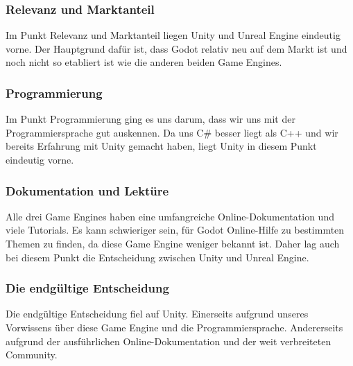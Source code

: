 \subsubsection{Relevanz und Marktanteil}
Im Punkt Relevanz und Marktanteil liegen Unity und Unreal Engine eindeutig vorne. Der Hauptgrund dafür ist, dass Godot relativ neu auf dem Markt ist und noch nicht so etabliert ist wie die anderen beiden Game Engines.

\subsubsection{Programmierung}
Im Punkt Programmierung ging es uns darum, dass wir uns mit der Programmiersprache gut auskennen. Da uns C\# besser liegt als C++ und wir bereits Erfahrung mit Unity gemacht haben, liegt Unity in diesem Punkt eindeutig vorne.

\subsubsection{Dokumentation und Lektüre}
Alle drei Game Engines haben eine umfangreiche Online-Dokumentation und viele Tutorials. Es kann schwieriger sein, für Godot Online-Hilfe zu bestimmten Themen zu finden, da diese Game Engine weniger bekannt ist. Daher lag auch bei diesem Punkt die Entscheidung zwischen Unity und Unreal Engine.

\subsubsection{Die endgültige Entscheidung}
Die endgültige Entscheidung fiel auf Unity. Einerseits aufgrund unseres Vorwissens über diese Game Engine und die Programmiersprache. Andererseits aufgrund der ausführlichen Online-Dokumentation und der weit verbreiteten Community.

\pagebreak